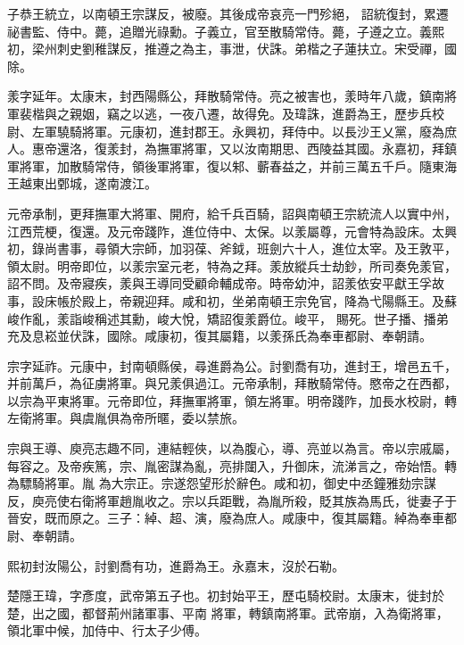 \begin{pinyinscope}
 子恭王統立，以南頓王宗謀反，被廢。其後成帝哀亮一門殄絕，
 詔統復封，累遷祕書監、侍中。薨，追贈光祿勳。子義立，官至散騎常侍。薨，子遵之立。義熙初，梁州刺史劉稚謀反，推遵之為主，事泄，伏誅。弟楷之子蓮扶立。宋受禪，國除。



 羕字延年。太康末，封西陽縣公，拜散騎常侍。亮之被害也，羕時年八歲，鎮南將軍裴楷與之親姻，竊之以逃，一夜八遷，故得免。及瑋誅，進爵為王，歷步兵校尉、左軍驍騎將軍。元康初，進封郡王。永興初，拜侍中。以長沙王乂黨，廢為庶人。惠帝還洛，復羕封，為撫軍將軍，又以汝南期思、西陵益其國。永嘉初，拜鎮軍將軍，加散騎常侍，領後軍將軍，復以邾、蘄春益之，并前三萬五千戶。隨東海
 王越東出鄄城，遂南渡江。



 元帝承制，更拜撫軍大將軍、開府，給千兵百騎，詔與南頓王宗統流人以實中州，江西荒梗，復還。及元帝踐阼，進位侍中、太保。以羕屬尊，元會特為設床。太興初，錄尚書事，尋領大宗師，加羽葆、斧鉞，班劍六十人，進位太宰。及王敦平，領太尉。明帝即位，以羕宗室元老，特為之拜。羕放縱兵士劫鈔，所司奏免羕官，詔不問。及帝寢疾，羕與王導同受顧命輔成帝。時帝幼沖，詔羕依安平獻王孚故事，設床帳於殿上，帝親迎拜。咸和初，坐弟南頓王宗免官，降為弋陽縣王。及蘇峻作亂，羕詣峻稱述其勳，峻大悅，矯詔復羕爵位。峻平，
 賜死。世子播、播弟充及息崧並伏誅，國除。咸康初，復其屬籍，以羕孫氏為奉車都尉、奉朝請。



 宗字延祚。元康中，封南頓縣侯，尋進爵為公。討劉喬有功，進封王，增邑五千，并前萬戶，為征虜將軍。與兄羕俱過江。元帝承制，拜散騎常侍。愍帝之在西都，以宗為平東將軍。元帝即位，拜撫軍將軍，領左將軍。明帝踐阼，加長水校尉，轉左衛將軍。與虞胤俱為帝所暱，委以禁旅。



 宗與王導、庾亮志趣不同，連結輕俠，以為腹心，導、亮並以為言。帝以宗戚屬，每容之。及帝疾篤，宗、胤密謀為亂，亮排闥入，升御床，流涕言之，帝始悟。轉為驃騎將軍。胤
 為大宗正。宗遂怨望形於辭色。咸和初，御史中丞鐘雅劾宗謀反，庾亮使右衛將軍趙胤收之。宗以兵距戰，為胤所殺，貶其族為馬氏，徙妻子于晉安，既而原之。三子：綽、超、演，廢為庶人。咸康中，復其屬籍。綽為奉車都尉、奉朝請。



 熙初封汝陽公，討劉喬有功，進爵為王。永嘉末，沒於石勒。



 楚隱王瑋，字彥度，武帝第五子也。初封始平王，歷屯騎校尉。太康末，徙封於楚，出之國，都督荊州諸軍事、平南
 將軍，轉鎮南將軍。武帝崩，入為衛將軍，領北軍中候，加侍中、行太子少傅。




\end{pinyinscope}
